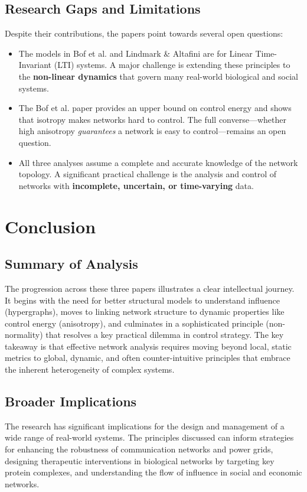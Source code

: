 \documentclass[10pt, a4paper]{article}
\begin{document}
\subsection{Research Gaps and Limitations}
Despite their contributions, the papers point towards several open questions:
\begin{itemize}
    \item The models in Bof et al. and Lindmark \& Altafini are for Linear Time-Invariant (LTI) systems. A major challenge is extending these principles to the \textbf{non-linear dynamics} that govern many real-world biological and social systems.
    \item The Bof et al. paper provides an upper bound on control energy and shows that isotropy makes networks hard to control. The full converse—whether high anisotropy \textit{guarantees} a network is easy to control—remains an open question.
    \item All three analyses assume a complete and accurate knowledge of the network topology. A significant practical challenge is the analysis and control of networks with \textbf{incomplete, uncertain, or time-varying} data.
\end{itemize}

\section{Conclusion}
\subsection{Summary of Analysis}
The progression across these three papers illustrates a clear intellectual journey. It begins with the need for better structural models to understand influence (hypergraphs), moves to linking network structure to dynamic properties like control energy (anisotropy), and culminates in a sophisticated principle (non-normality) that resolves a key practical dilemma in control strategy. The key takeaway is that effective network analysis requires moving beyond local, static metrics to global, dynamic, and often counter-intuitive principles that embrace the inherent heterogeneity of complex systems.

\subsection{Broader Implications}
The research has significant implications for the design and management of a wide range of real-world systems. The principles discussed can inform strategies for enhancing the robustness of communication networks and power grids, designing therapeutic interventions in biological networks by targeting key protein complexes, and understanding the flow of influence in social and economic networks.
\end{document}
